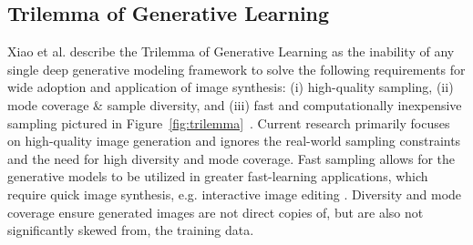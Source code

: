 \documentclass[technologies,article,accept,pdftex,moreauthors]{Definitions/mdpi}
\newcommand{\figref}[1]{Figure~\ref{#1}}
\begin{document}
\subsection{Trilemma of Generative Learning}
\label{trilemmaGL}
Xiao et al. describe the Trilemma of Generative Learning as the inability of any single deep generative modeling framework to solve the following requirements for wide adoption and application of image synthesis: (i) high-quality sampling, (ii) mode coverage \& sample diversity, and (iii) fast and computationally inexpensive sampling \cite{xiao2022DDGAN} pictured in \figref{fig:trilemma}~\cite{xiao2022DDGAN}. Current research primarily focuses on high-quality image generation and ignores the real-world sampling constraints and the need for high diversity and mode coverage. Fast sampling allows for the generative models to be utilized in greater fast-learning applications, which require quick image synthesis, e.g. interactive image editing \cite{xiao2022DDGAN}. Diversity and mode coverage ensure generated images are not direct copies of, but are also not significantly skewed from, the training data.
\end{document}
